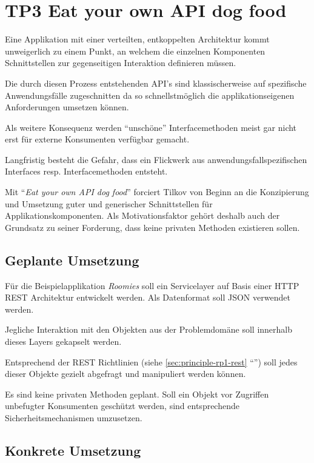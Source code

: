 \section{TP3 Eat your own API dog food}
\label{sec:principle-tp3-eat-your-own-api}

Eine Applikation mit einer verteilten, entkoppelten Architektur kommt unweigerlich zu einem Punkt, an welchem die einzelnen Komponenten Schnittstellen zur gegenseitigen Interaktion definieren müssen.

Die durch diesen Prozess entstehenden API's sind klassischerweise auf spezifische Anwendungsfälle zugeschnitten da so schnellstmöglich die applikationseigenen Anforderungen umsetzen können.

Als weitere Konsequenz werden ``unschöne'' Interfacemethoden meist gar nicht erst für externe Konsumenten verfügbar gemacht.

Langfristig besteht die Gefahr, dass ein Flickwerk aus anwendungsfallspezifischen Interfaces resp. Interfacemethoden entsteht.

Mit ``\emph{Eat your own API dog food}'' forciert Tilkov \cite{TilkovSlides} von Beginn an die Konzipierung und Umsetzung guter und generischer Schnittstellen für Applikationskomponenten. Als Motivationsfaktor gehört deshalb auch der Grundsatz zu seiner Forderung, dass keine privaten Methoden existieren sollen.


\subsection*{Geplante Umsetzung}

Für die Beispielapplikation \emph{Roomies} soll ein Servicelayer auf Basis einer HTTP \gls{REST} Architektur entwickelt werden. Als Datenformat soll \gls{JSON} verwendet werden.

Jegliche Interaktion mit den Objekten aus der Problemdomäne soll innerhalb dieses Layers gekapselt werden.

Entsprechend der \gls{REST} Richtlinien (siehe \ref{sec:principle-rp1-rest} ``'') soll jedes dieser Objekte gezielt abgefragt und manipuliert werden können.

Es sind keine privaten Methoden geplant. Soll ein Objekt vor Zugriffen unbefugter Konsumenten geschützt werden, sind entsprechende Sicherheitsmechanismen umzusetzen.


\subsection*{Konkrete Umsetzung}


